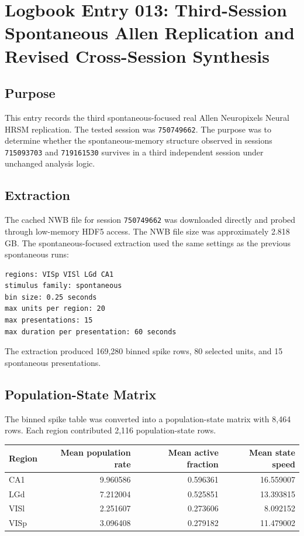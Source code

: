 \section{Logbook Entry 013: Third-Session Spontaneous Allen Replication and Revised Cross-Session Synthesis}
\label{sec:logbook-entry-013-third-session-spontaneous-replication}

\subsection{Purpose}

This entry records the third spontaneous-focused real Allen Neuropixels Neural HRSM replication. The tested session was \texttt{750749662}. The purpose was to determine whether the spontaneous-memory structure observed in sessions \texttt{715093703} and \texttt{719161530} survives in a third independent session under unchanged analysis logic.

\subsection{Extraction}

The cached NWB file for session \texttt{750749662} was downloaded directly and probed through low-memory HDF5 access. The NWB file size was approximately 2.818 GB. The spontaneous-focused extraction used the same settings as the previous spontaneous runs:

\begin{verbatim}
regions: VISp VISl LGd CA1
stimulus family: spontaneous
bin size: 0.25 seconds
max units per region: 20
max presentations: 15
max duration per presentation: 60 seconds
\end{verbatim}

The extraction produced 169,280 binned spike rows, 80 selected units, and 15 spontaneous presentations.

\subsection{Population-State Matrix}

The binned spike table was converted into a population-state matrix with 8,464 rows. Each region contributed 2,116 population-state rows.

\begin{center}
\begin{tabular}{lrrr}
\hline
Region & Mean population rate & Mean active fraction & Mean state speed \\
\hline
CA1 & 9.960586 & 0.596361 & 16.559007 \\
LGd & 7.212004 & 0.525851 & 13.393815 \\
VISl & 2.251607 & 0.273606 & 8.092152 \\
VISp & 3.096408 & 0.279182 & 11.479002 \\
\hline
\end{tabular}
\end{center}

